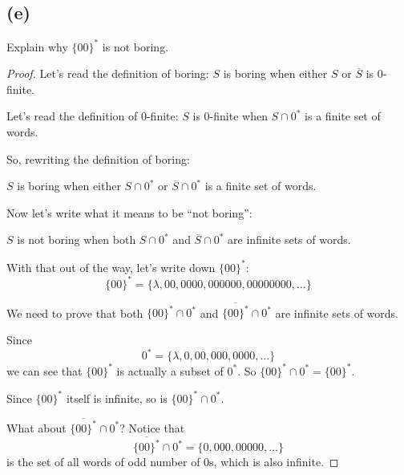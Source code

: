 \documentclass[14pt]{extarticle}
\begin{document}
\subsection{(e)}
Explain why $\{00\}^*$ is not boring.
\begin{proof}
Let's read the definition of boring: $S$ is boring when either $S$ or $\overline{S}$ is 0-finite.

Let's read the definition of 0-finite: $S$ is 0-finite when $S\cap 0^*$ is a finite set of words.

So, rewriting the definition of boring:

$S$ is boring when either $S\cap 0^*$ or $\overline{S}\cap 0^*$ is a finite set of words.

Now let's write what it means to be ``not boring'':

$S$ is not boring when both $S\cap 0^*$ and $\overline{S}\cap 0^*$ are infinite sets of words.

With that out of the way, let's write down $\{00\}^*$:
$$
\{00\}^* = \{\lambda, 00, 0000, 000000, 00000000, \ldots\}
$$

We need to prove that both $\{00\}^* \cap 0^*$ and $\overline{\{00\}^*}\cap 0^*$ are infinite sets of words.

Since
$$
0^* = \{\lambda, 0, 00, 000, 0000, \ldots\}
$$
we can see that $\{00\}^*$ is actually a subset of $0^*$. So $\{00\}^* \cap 0^* = \{00\}^*$. 

Since $\{00\}^*$ itself is infinite, so is $\{00\}^* \cap 0^*$.

What about $\overline{\{00\}^*}\cap 0^*$? Notice that
$$
\overline{\{00\}^*}\cap 0^* = \{0, 000, 00000, \ldots\}
$$
is the set of all words of odd number of 0s, which is also infinite.
\end{proof}
\end{document}
